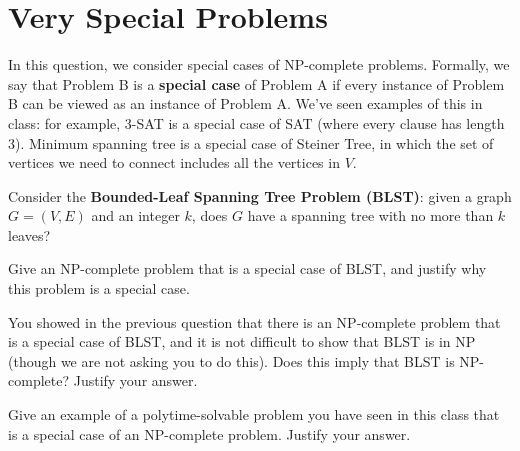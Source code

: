 \section{Very Special Problems}

In this question, we consider special cases of NP-complete problems. Formally, we say that Problem B is a \textbf{special case} of Problem A if every instance of Problem B can be viewed as an instance of Problem A. We've seen examples of this in class: for example, 3-SAT is a special case of SAT (where every clause has length 3). Minimum spanning tree is a special case of Steiner Tree, in which the set of vertices we need to connect includes all the vertices in $V$.

\begin{questions}

\question[4] Consider the \textbf{Bounded-Leaf Spanning Tree Problem (BLST)}: given a graph $G = (V,E)$ and an integer $k$, does $G$ have a spanning tree with no more than $k$ leaves?

Give an NP-complete problem that is a special case of BLST, and justify why this problem is a special case.

\ifsolutions\fi

\question[3] You showed in the previous question that there is an NP-complete problem that is a special case of BLST, and it is not difficult to show that BLST is in NP (though we are not asking you to do this). Does this imply that BLST is NP-complete? Justify your answer.

\ifsolutions\fi

\question[4] Give an example of a polytime-solvable problem you have seen in this class that is a special case of an NP-complete problem. Justify your answer.

\ifsolutions\fi

\end{questions}